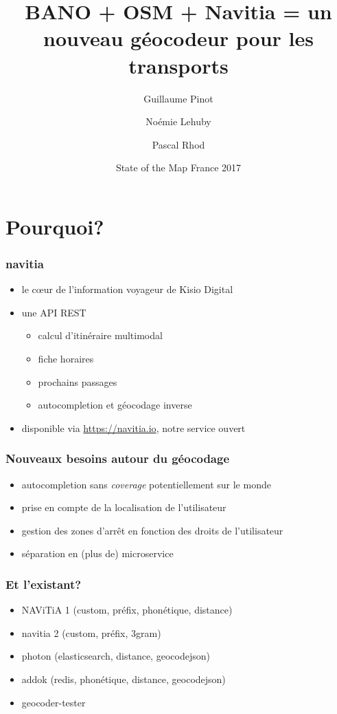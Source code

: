 \documentclass[table]{beamer}
\title[BANO + OSM + Navitia]{BANO + OSM + Navitia = un nouveau géocodeur pour les transports}
\author{Guillaume Pinot \and Noémie Lehuby \and Pascal Rhod}
\institute[Kisio Digital] %
{
  Kisio Digital\\
  20 rue Hector Malot\\
  75012 Paris, France}
\date{State of the Map France 2017}
\newcommand*{\foreign}[2][english]{%
    \emph{\foreignlanguage{#1}{#2}}%
}
\begin{document}
\begin{frame}
  \titlepage
\end{frame}

\section{Pourquoi?}

\begin{frame}
  \frametitle{navitia}

  \begin{itemize}
  \item le cœur de l'information voyageur de Kisio Digital
  \item une API REST
    \begin{itemize}
    \item calcul d'itinéraire multimodal
    \item fiche horaires
    \item prochains passages
    \item autocompletion et géocodage inverse
    \end{itemize}
  \item disponible via \url{https://navitia.io}, notre service ouvert
  \end{itemize}
\end{frame}

\begin{frame}
  \frametitle{Nouveaux besoins autour du géocodage}

  \begin{itemize}
  \item autocompletion sans \foreign{coverage} potentiellement sur le monde
  \item prise en compte de la localisation de l'utilisateur
  \item gestion des zones d'arrêt en fonction des droits de l'utilisateur
  \item séparation en (plus de) microservice
  \end{itemize}
\end{frame}

\begin{frame}
  \frametitle{Et l'existant?}

  \begin{itemize}
  \item NAViTiA 1 (custom, préfix, phonétique, distance)
  \item navitia 2 (custom, préfix, 3gram)
  \item photon (elasticsearch, distance, geocodejson)
  \item addok (redis, phonétique, distance, geocodejson)
  \item geocoder-tester
  \end{itemize}
\end{frame}
\end{document}

